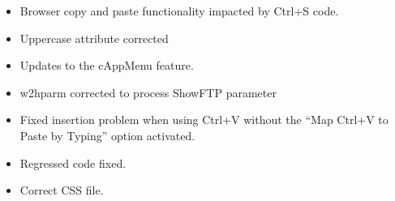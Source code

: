 \documentclass[letterpaper,10pt,english]{sphinxmanual}
\begin{document}
\sphinxAtStartPar
{}
\begin{itemize}
\item {} 
\sphinxAtStartPar
Browser copy and paste functionality impacted by Ctrl+S code.

\end{itemize}

\sphinxAtStartPar
{}
\begin{itemize}
\item {} 
\sphinxAtStartPar
Uppercase attribute corrected

\end{itemize}

\sphinxAtStartPar
{}
\begin{itemize}
\item {} 
\sphinxAtStartPar
Updates to the cAppMenu feature.

\end{itemize}

\sphinxAtStartPar
{}
\begin{itemize}
\item {} 
\sphinxAtStartPar
w2hparm corrected to process ShowFTP parameter

\end{itemize}

\sphinxAtStartPar
{}
\begin{itemize}
\item {} 
\sphinxAtStartPar
Fixed insertion problem when using Ctrl+V without the “Map Ctrl+V to Paste by Typing” option activated.

\end{itemize}

\sphinxAtStartPar
{}
\begin{itemize}
\item {} 
\sphinxAtStartPar
Regressed code fixed.

\end{itemize}

\sphinxAtStartPar
{}
\begin{itemize}
\item {} 
\sphinxAtStartPar
Correct CSS file.

\end{itemize}
\end{document}
